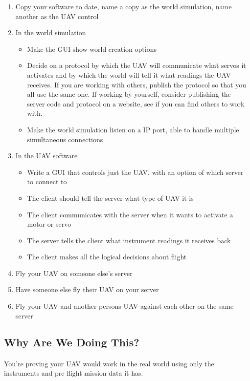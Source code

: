 \documentclass[11pt]{book}
\begin{document}
\begin{enumerate}
\item Copy your software to date, name a copy as the world simulation, name another as the UAV control
\item In the world simulation 
    \begin{itemize}
        \item Make the GUI show world creation options
        \item Decide on a protocol by which the UAV will communicate what servos it activates and by which the world will tell it what readings the UAV receives. If you are working with others, publish the protocol so that you all use the same one. If working by yourself, consider publishing the server code and protocol on a website, see if you can find others to work with.
        \item Make the world simulation listen on a IP port, able to handle multiple simultaneous connections
    \end{itemize}
\item In the UAV software
    \begin{itemize}
        \item Write a GUI that controls just the UAV, with an option of which server to connect to
        \item The client should tell the server what type of UAV it is
        \item The client communicates with the server when it wants to activate a motor or servo
        \item The server tells the client what instrument readings it receives back
        \item The client makes all the logical decisions about flight
    \end{itemize}
\item Fly your UAV on someone else's server
\item Have someone else fly their UAV on your server
\item Fly your UAV and another persons UAV against each other on the same server
\end{enumerate}

\subsection{Why Are We Doing This?}

\paragraph{} You're proving your UAV would work in the real world using only
the instruments and pre flight mission data it has.
 
\end{document}
